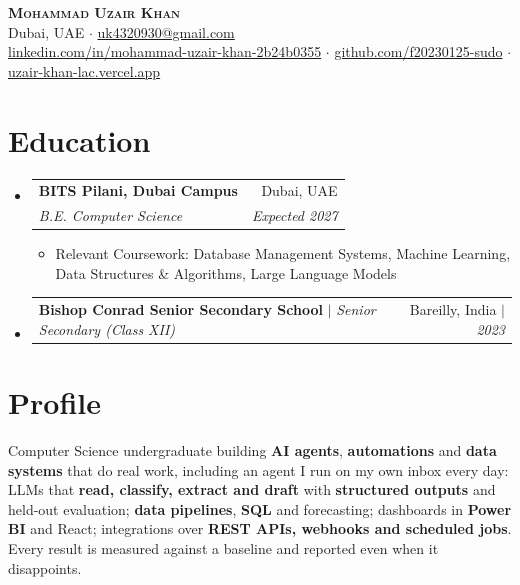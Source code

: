 \documentclass[letterpaper,10pt]{article}
\makeatletter
\newcommand{\namefont}{\bfseries\scshape}
\newcommand{\resumeItem}[1]{
  \item\small{
    {#1 \vspace{-2pt}}
  }
}
\newcommand{\resumeSubheading}[4]{
  \vspace{-2pt}\item
    \begin{tabular*}{0.97\textwidth}[t]{l@{\extracolsep{\fill}}r}
      \textbf{#1} & #2 \\
      \textit{\small#3} & \textit{\small #4} \\
    \end{tabular*}\vspace{-7pt}
}
\newcommand{\resumeProjectHeading}[2]{
    \item
    \begin{tabular*}{0.97\textwidth}{l@{\extracolsep{\fill}}r}
      \small#1 & #2 \\
    \end{tabular*}\vspace{-7pt}
}
\newcommand{\resumeSubHeadingListStart}{\begin{itemize}[leftmargin=0.15in, label={}]}
\newcommand{\resumeSubHeadingListEnd}{\end{itemize}}
\newcommand{\resumeItemListStart}{\begin{itemize}}
\newcommand{\resumeItemListEnd}{\end{itemize}\vspace{-5pt}}
\makeatother
\begin{document}
\linespread{1.0}\selectfont %

\begin{center}
    {\namefont\Huge Mohammad Uzair Khan} \\ \vspace{1pt}
    \small Dubai, UAE $\cdot$ \href{mailto:uk4320930@gmail.com}{uk4320930@gmail.com} \\
    \href{https://linkedin.com/in/mohammad-uzair-khan-2b24b0355}{linkedin.com/in/mohammad-uzair-khan-2b24b0355} $\cdot$
    \href{https://github.com/f20230125-sudo}{github.com/f20230125-sudo} $\cdot$
    \href{https://uzair-khan-lac.vercel.app}{uzair-khan-lac.vercel.app}
\end{center}

\section{Education}
  \resumeSubHeadingListStart
    \resumeSubheading
      {BITS Pilani, Dubai Campus}{Dubai, UAE}
      {B.E. Computer Science}{Expected 2027}
      \resumeItemListStart
        \resumeItem{Relevant Coursework: Database Management Systems, Machine Learning, Data Structures \& Algorithms, Large Language Models}
      \resumeItemListEnd
    \resumeProjectHeading
      {\textbf{\normalsize Bishop Conrad Senior Secondary School} $|$ \emph{Senior Secondary (Class XII)}}
      {Bareilly, India $|$ \emph{2023}}
    \vspace{4pt}
  \resumeSubHeadingListEnd
\section{Profile}
 \begin{itemize}[leftmargin=0.15in, label={}]
    \small{\item{Computer Science undergraduate building \textbf{AI agents}, \textbf{automations} and \textbf{data systems} that do real work, including an agent I run on my own inbox every day: LLMs that \textbf{read, classify, extract and draft} with \textbf{structured outputs} and held-out evaluation; \textbf{data pipelines}, \textbf{SQL} and forecasting; dashboards in \textbf{Power BI} and React; integrations over \textbf{REST APIs, webhooks and scheduled jobs}. Every result is measured against a baseline and reported even when it disappoints.}}
 \end{itemize}

\end{document}
